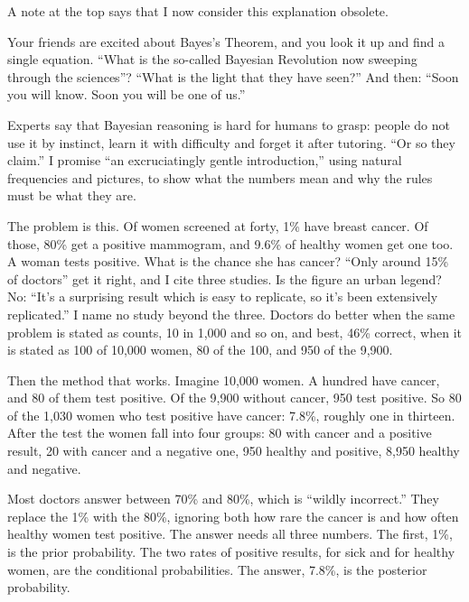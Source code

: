 
A note at the top says that I now consider this explanation obsolete. 

Your friends are excited about Bayes's Theorem, and you look it up and find a single equation. ``What is the so-called Bayesian Revolution now sweeping through the sciences''? ``What is the light that they have seen?'' And then: ``Soon you will know. Soon you will be one of us.''

Experts say that Bayesian reasoning is hard for humans to grasp: people do not use it by instinct, learn it with difficulty and forget it after tutoring. ``Or so they claim.'' I promise ``an excruciatingly gentle introduction,'' using natural frequencies and pictures, to show what the numbers mean and why the rules must be what they are.

The problem is this. Of women screened at forty, 1\% have breast cancer. Of those, 80\% get a positive mammogram, and 9.6\% of healthy women get one too. A woman tests positive. What is the chance she has cancer? ``Only around 15\% of doctors'' get it right, and I cite three studies.  Is the figure an urban legend? No: ``It's a surprising result which is easy to replicate, so it's been extensively replicated.'' I name no study beyond the three. Doctors do better when the same problem is stated as counts, 10 in 1,000 and so on, and best, 46\% correct, when it is stated as 100 of 10,000 women, 80 of the 100, and 950 of the 9,900.

Then the method that works. Imagine 10,000 women. A hundred have cancer, and 80 of them test positive. Of the 9,900 without cancer, 950 test positive. So 80 of the 1,030 women who test positive have cancer: 7.8\%, roughly one in thirteen.  After the test the women fall into four groups: 80 with cancer and a positive result, 20 with cancer and a negative one, 950 healthy and positive, 8,950 healthy and negative.

Most doctors answer between 70\% and 80\%, which is ``wildly incorrect.'' They replace the 1\% with the 80\%, ignoring both how rare the cancer is and how often healthy women test positive. The answer needs all three numbers. The first, 1\%, is the prior probability. The two rates of positive results, for sick and for healthy women, are the conditional probabilities. The answer, 7.8\%, is the posterior probability.

